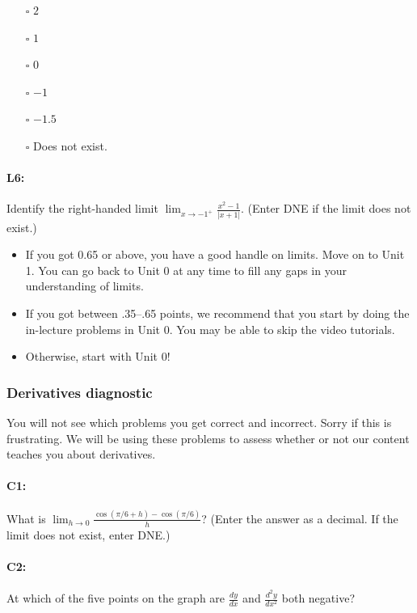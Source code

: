 \documentclass[pdftex, brazil, 12pt, twoside]{article}
\begin{document}
\begin{itemize}[noitemsep]
\item[$\square$] $2$
\item[$\square$] $1$
\item[$\square$] $0$
\item[$\square$] $-1$
\item[$\square$] $-1.5$
\item[$\square$] Does not exist.
\end{itemize}

\paragraph{L6:} Identify the right-handed limit $\displaystyle \lim_{x \to -1^+} \frac{x^2 -1}{|x+1|}$.
(Enter DNE if the limit does not exist.)

\begin{itemize}[noitemsep]
\item If you got 0.65 or above, you have a good handle on limits. Move on to Unit 1.
  You can go back to Unit 0 at any time to fill any gaps in your understanding of limits.
\item If you got between .35--.65 points, we recommend that you start by doing the in-lecture
  problems in Unit 0. You may be able to skip the video tutorials.
\item Otherwise, start with Unit 0!
\end{itemize}

\subsubsection{Derivatives diagnostic}
\label{gs-adventure-derivative}

You will not see which problems you get correct and incorrect. Sorry if this is frustrating. We will be using these problems to assess whether or not our content teaches you about derivatives.

\paragraph{C1:} What is $\displaystyle \lim_{h \to 0} \frac{\cos{(\pi/6 + h)}-\cos{(\pi/6)}}{h}$? 
(Enter the answer as a decimal. If the limit does not exist, enter DNE.)

\paragraph{C2:} At which of the five points on the graph are $\frac{dy}{dx}$ and $\frac{d^2y}{dx^2}$ both negative?
\end{document}
